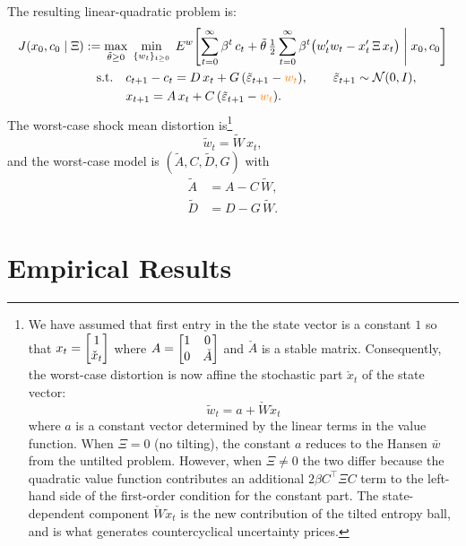 \documentclass[12pt]{article}
\theoremstyle{definition}
\begin{document}
The resulting linear-quadratic problem is:
\begin{align}
J(x_0, c_0 \mid \Xi) &:= \max_{\tilde\theta \geq 0}\;
    \min_{\{w_t\}_{t\geq 0}}\;
    E^w\!\left[\sum_{t=0}^{\infty} \beta^t\, c_t
    + \tilde\theta\, \tfrac{1}{2}\sum_{t=0}^{\infty} \beta^t
    \bigl(w_t' w_t - x_t'\,\Xi\, x_t\bigr)
    \;\middle|\; x_0, c_0\right] \label{eq:szoke-seq}\\
&\quad \text{s.t.}\quad
    c_{t+1} - c_t = D\, x_t + G\,(\tilde\varepsilon_{t+1}
    - {\color{orange} w_t}), \qquad
    \tilde\varepsilon_{t+1} \sim {\mathcal N}(0,I), \notag\\
&\quad\hphantom{\text{s.t.}}\quad
    x_{t+1} = A\, x_t + C\,(\tilde\varepsilon_{t+1}
    - {\color{orange} w_t}). \notag
\end{align}
The worst-case shock mean distortion
 is\footnote{We have assumed that first entry in the the state vector is a constant $1$ so that 
 $x_t = \begin{bmatrix} 1 \cr \check x_t \end{bmatrix}$ where 
 $A = \begin{bmatrix} 1 & 0 \cr 0 & \check A \end{bmatrix} $ and $\check A$ is a stable matrix.
 Consequently, the worst-case distortion is now affine the stochastic part $\check x_t$ of the state vector:
$$
\tilde{w}_t = a + \check {W} \check x_t
$$
where $a$ is a constant vector determined by the linear terms in the value function.
When $\Xi = 0$ (no tilting), the constant $a$ reduces to the Hansen $\bar{w}$ from the untilted problem.
However, when $\Xi \neq 0$ the two differ because the quadratic value function contributes an additional $2\beta C^\top \Xi C$ term to the left-hand side of the first-order condition for the constant part. The state-dependent component $\check{W} \check x_t$ is the new contribution of the tilted entropy ball, and is what generates countercyclical uncertainty prices. }
\[
   \tilde w_t = \widetilde W\, x_t,
\]
and the worst-case model is $(\tilde A, C, \tilde D, G)$ with
\begin{align*}
\tilde A &= A - C\,\tilde W, \\
\tilde D &= D - G\,\tilde W.
\end{align*}


\section{Empirical Results}
\label{sec:empirics}
\end{document}
